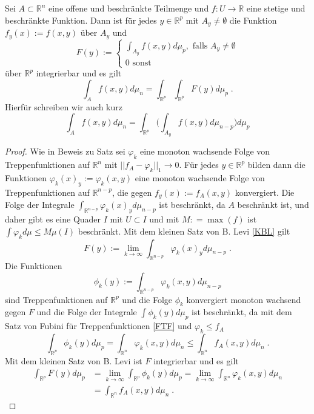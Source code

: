 \begin{Satz}
Sei $A \subset \mathbb{R}^n$ eine offene und beschränkte Teilmenge und $f : U \to \mathbb{R}$  eine stetige und beschränkte Funktion.
Dann ist für jedes $ y \in \mathbb{R}^p$ mit $A_y \neq \emptyset$ die Funktion $f_y(x) := f(x,y)$ über $A_y$ und   
$$ F(y) := \begin{cases}   \int_{A_y} f(x,y) d \mu_{p}  , \text{ falls }  A_y \neq \emptyset 
\\ 0 \text{ sonst } \end{cases} $$
über $\mathbb{R}^{p}$ integrierbar und es gilt 
$$ \int_A f(x,y) d \mu_n = \int_{\mathbb{R}^p}  \int_{\mathbb{R}^p } F(y) d \mu_p \; .$$
 Hierfür schreiben wir auch kurz
$$ \int_A f(x,y) d \mu_n  = \int_{\mathbb{R}^{p} }  \biggl ( \int_{A_y} f(x,y)  d\mu_{n-p} \biggr ) d\mu_p$$
\end{Satz}
\begin{proof}
Wie in Beweis zu Satz \label{fintu} sei  $\varphi_k$ eine monoton wachsende Folge von Treppenfunktionen auf $\mathbb{R}^n$ mit $|| f_A - \varphi_k ||_1 \to 0$.
Für jedes $y \in \mathbb{R}^p$ bilden dann die Funktionen $\varphi_k(x)_y := \varphi_k(x,y)$ eine monoton wachsende Folge von Treppenfunktionen auf $\mathbb{R}^{n-p}$, die gegen $f_y(x):= f_A(x,y)$ konvergiert. Die Folge der Integrale $\int_{\mathbb{R}^{n-p}} \varphi_k(x)_y d \mu_{n-p}$ ist beschränkt,  da $A$ beschränkt ist, und daher gibt es eine Quader $I$ mit $U \subset I$ und  mit $M : = \max (f)$  ist $\int \varphi_k d \mu \leq M \mu(I)$ beschränkt. Mit dem kleinen Satz von B. Levi \ref{KBL}
gilt
$$ F(y) := \lim_{k \to \infty} \int_{\mathbb{R}^{n-p}} \varphi_k(x)_y d \mu_{n-p} \; .$$
Die Funktionen 
$$\phi_k (y) := \int_{\mathbb{R}^{n-p}} \varphi_k (x,y) d \mu_{n-p}$$
sind Treppenfunktionen auf $\mathbb{R}^{p}$ und die Folge $\phi_k$ konvergiert monoton wachsend gegen $F$ und die Folge der Integrale 
$\int \phi_k(y) d \mu_{p}$ ist beschränkt, da  mit dem Satz von Fubini für Treppenfunktionen \ref{FTF} und $\varphi_k \leq f_A$  
$$ \int_{\mathbb{R}^{p}} \phi_k(y) d \mu_{p} = \int_{\mathbb{R}^n} \varphi_k(x,y) d\mu_{n} \leq \int_{\mathbb{R}^n} f_A(x,y) d \mu_{n} \; .$$
Mit dem kleinen Satz von B. Levi ist $F$ integrierbar und es gilt
\begin{align*}
 \int_{\mathbb{R}^{p}}   F(y) d \mu_{p} & = \lim_{k \to \infty}  \int_{\mathbb{R}^{p}}  \phi_k (y) d \mu_{p} =  \lim_{k \to \infty}  \int_{\mathbb{R}^{n}}  \varphi_k(x,y) d \mu_{n} \\
& =   \int_{\mathbb{R}^{n}}  f_A (x,y) d \mu_{n}  \; .
\end{align*} 
\end{proof}



